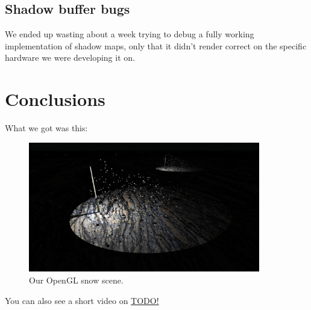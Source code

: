\documentclass[a4paper,12pt]{article}
\begin{document}
\subsection{Shadow buffer bugs}

We ended up wasting about a week trying to debug a fully working implementation of shadow maps, only that it didn't render correct on the specific hardware we were developing it on.


\section{Conclusions}

What we got was this:

\begin{figure}[ht]
  \centering
  \includegraphics[width=0.9\textwidth]{result}
  \caption{\label{fig:label} Our OpenGL snow scene.}
\end{figure}

You can also see a short video on \href{YouTube}{TODO!}
\end{document}
